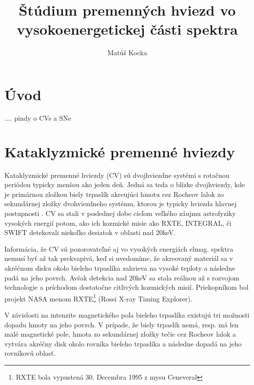 \documentclass[oneside,a4paper,11pt]{report}
\title{Štúdium premenných hviezd vo vysokoenergetickej části spektra}
\author{Matúš Kocka}
\begin{document}
\tableofcontents

\chapter*{Úvod}

.... pindy o CVs a SNe 

\chapter{Kataklyzmické premenné hviezdy }
Kataklyzmické premenné hviezdy (CV) sú dvojhviezdne systémi s rotačnou periódou typicky menšou 
ako jeden deň. Jedná sa teda o blízke dvojhviezdy, kde je primárnou zložkou biely trpaslík 
akreujúci hmotu cez Rocheov lalok zo sekundárnej zložky dvohviezdneho systému, ktorou je 
typicky hviezda hlavnej postupnosti \cite{(Warner 1995)}. CV sa stali v poslednej dobe 
cieľom veľkého záujmu astrofyziky vysokých energií potom, ako ich kozmické misie ako RXTE, 
INTEGRAL, či SWIFT detekovali niekoľko desiatok v oblasti nad 20keV. 

Informácia, že CV sú pozorovateľné aj vo vysokých energiách elmag. spektra nemusí byť až 
tak prekvapivá, keď si uvedomíme, že akreovaný materiál sa v akréčnom disku 
okolo bieleho trpaslíka zahrieva na vysoké teploty a následne padá na jeho povrch. 
Avšak detekcia nad 20keV sa 
stala reálnou až s rozvojom technologie a príchodom dostatočne citlivých kozmických misií. 
Priekopníkom bol projekt NASA menom RXTE\footnote{RXTE bola vypustená 30. Decembra 1995 z mysu Ceneveral} 
(Rossi X-ray Timing Explorer).

V závislosti na intenzite magnetického poľa bieleho trpaslíka existujú tri možnosti dopadu hmoty na 
jeho povrch. V prípade, že biely trpaslík nemá, resp. má len malé magnetické pole, hmota zo
sekundárnej zložky tečie cez Rocheov lalok a vytvára akréčny disk okolo rovníka bieleho trpaslíka a 
následne dopadá na jeho rovníkovú oblasť. 
\end{document}
